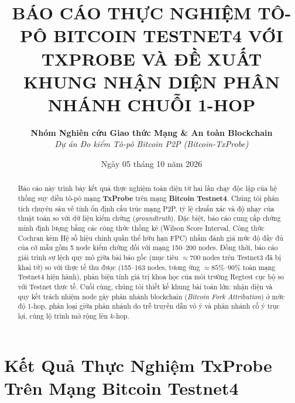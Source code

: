 \documentclass[11pt,a4paper]{article}
\title{\textbf{\LARGE BÁO CÁO THỰC NGHIỆM TÔ-PÔ BITCOIN TESTNET4 VỚI TXPROBE VÀ ĐỀ XUẤT KHUNG NHẬN DIỆN PHÂN NHÁNH CHUỖI 1-HOP}}
\author{\textbf{Nhóm Nghiên cứu Giao thức Mạng \& An toàn Blockchain} \\
\textit{Dự án Đo kiểm Tô-pô Bitcoin P2P (Bitcoin-TxProbe)}}
\date{Ngày 05 tháng 10 năm 2026}
\begin{document}
\maketitle

\begin{abstract}
Báo cáo này trình bày kết quả thực nghiệm toàn diện từ hai lần chạy độc lập của hệ thống suy diễn tô-pô mạng \textbf{TxProbe} trên mạng \textbf{Bitcoin Testnet4}. Chúng tôi phân tích chuyên sâu về tính ổn định cấu trúc mạng P2P, tỷ lệ chuẩn xác và độ nhạy của thuật toán so với dữ liệu kiểm chứng (\textit{groundtruth}). Đặc biệt, báo cáo cung cấp chứng minh định lượng bằng các công thức thống kê (Wilson Score Interval, Công thức Cochran kèm Hệ số hiệu chỉnh quần thể hữu hạn FPC) nhằm đánh giá mức độ đầy đủ của cỡ mẫu gồm 5 node kiểm chứng đối với mạng 150--200 nodes. Đồng thời, báo cáo giải trình sự lệch quy mô giữa bài báo gốc (mục tiêu $\approx 700$ nodes trên Testnet3 đã bị khai tử) so với thực tế thu được (155--163 nodes, tương ứng $\approx 85\%$--$90\%$ toàn mạng Testnet4 hiện hành), phản biện tính giá trị khoa học của môi trường Regtest cục bộ so với Testnet thực tế. Cuối cùng, chúng tôi thiết kế khung bài toán lớn: nhận diện và quy kết trách nhiệm node gây phân nhánh blockchain (\textit{Bitcoin Fork Attribution}) ở mức độ 1-hop, phân loại giữa phân nhánh do trễ truyền dẫn vô ý và phân nhánh cố ý trục lợi, cùng lộ trình mở rộng lên $k$-hop.
\end{abstract}

\tableofcontents
\newpage

\section{Kết Quả Thực Nghiệm TxProbe Trên Mạng Bitcoin Testnet4}
\end{document}
